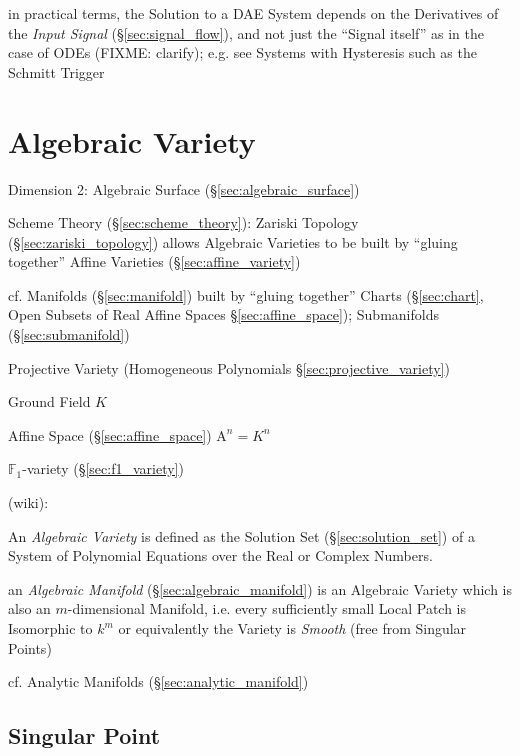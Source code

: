in practical terms, the Solution to a DAE System depends on the Derivatives of
the \emph{Input Signal} (\S\ref{sec:signal_flow}), and not just the ``Signal
itself'' as in the case of ODEs
(FIXME: clarify); e.g. see Systems with Hysteresis such as the Schmitt Trigger



\section{Algebraic Variety}\label{sec:algebraic_variety}

Dimension 2: Algebraic Surface (\S\ref{sec:algebraic_surface})

Scheme Theory (\S\ref{sec:scheme_theory}): Zariski Topology
(\S\ref{sec:zariski_topology}) allows Algebraic Varieties to be built by
``gluing together'' Affine Varieties (\S\ref{sec:affine_variety})

cf. Manifolds (\S\ref{sec:manifold}) built by ``gluing together'' Charts
(\S\ref{sec:chart}, Open Subsets of Real Affine Spaces
\S\ref{sec:affine_space}); Submanifolds (\S\ref{sec:submanifold})

\fist Projective Variety (Homogeneous Polynomials
\S\ref{sec:projective_variety})

Ground Field $K$

Affine Space (\S\ref{sec:affine_space}) $\mathrm{A}^n = K^n$

\fist $\mathbb{F}_1$-variety (\S\ref{sec:f1_variety})


(wiki):

An \emph{Algebraic Variety} is defined as the Solution Set
(\S\ref{sec:solution_set}) of a System of Polynomial Equations over the Real or
Complex Numbers.

\fist an \emph{Algebraic Manifold} (\S\ref{sec:algebraic_manifold}) is an
Algebraic Variety which is also an $m$-dimensional Manifold, i.e. every
sufficiently small Local Patch is Isomorphic to $k^m$ or equivalently the
Variety is \emph{Smooth} (free from Singular Points)

cf. Analytic Manifolds (\S\ref{sec:analytic_manifold})



\subsection{Singular Point}\label{sec:singular_point}

